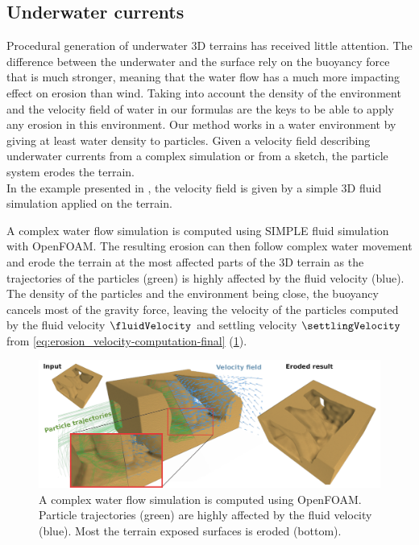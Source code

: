 \subsection{Underwater currents}
Procedural generation of underwater 3D terrains has received little attention. The difference between the underwater and the surface rely on the buoyancy force that is much stronger, meaning that the water flow has a much more impacting effect on erosion than wind. Taking into account the density of the environment and the velocity field of water in our formulas are the keys to be able to apply any erosion in this environment. 
Our method works in a water environment by giving at least water density to particles. Given a velocity field describing underwater currents from a complex simulation or from a sketch, the particle system erodes the terrain. \\ 
In the example presented in , the velocity field is given by a simple 3D fluid simulation \cite{Stam1999} applied on the terrain.

A complex water flow simulation is computed using SIMPLE \cite{Caretto1973} fluid simulation with OpenFOAM. The resulting erosion can then follow complex water movement and erode the terrain at the most affected parts of the 3D terrain as the trajectories of the particles (green) is highly affected by the fluid velocity (blue). The density of the particles and the environment being close, the buoyancy cancels most of the gravity force, leaving the velocity of the particles computed by the fluid velocity $\fluidVelocity$ and settling velocity $\settlingVelocity$ from \eqref{eq:erosion_velocity-computation-final} (\cref{fig:erosion_underwater_result}).
\begin{figure}[ht]
    \includegraphics{flowfield.pdf}
    \caption{A complex water flow simulation is computed using OpenFOAM. Particle trajectories (green) are highly affected by the fluid velocity (blue). Most the terrain exposed surfaces is eroded (bottom). }
    \label{fig:erosion_underwater_result}
\end{figure}



